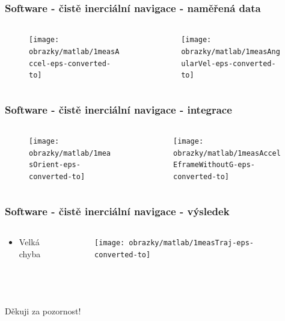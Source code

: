 \documentclass[%
  12pt,       				%
	t,                  %
	aspectratio=1610,   %
	unicode,						%
]{beamer}				    	%
\begin{document}
\begin{frame} 
	\frametitle{Software - čistě inerciální navigace - naměřená data}
	\begin{columns}[T] 								%
		\begin{column}{0.5\textwidth}		%
		\begin{figure}%
		\centering
		\texttt{[image: obrazky/matlab/1measAccel-eps-converted-to]}
		\end{figure}

		\end{column}
		\begin{column}{0.5\textwidth}		%
		\begin{figure}%
		\centering
		\texttt{[image: obrazky/matlab/1measAngularVel-eps-converted-to]}
		\end{figure}
		\end{column}
	\end{columns}	
\end{frame}

\begin{frame} 
	\frametitle{Software - čistě inerciální navigace - integrace}
	\begin{columns}[T] 								%
		\begin{column}{0.5\textwidth}		%
		\begin{figure}%
		\centering
		\texttt{[image: obrazky/matlab/1measOrient-eps-converted-to]}
		\end{figure}

		\end{column}
		\begin{column}{0.5\textwidth}		%
		\begin{figure}%
		\centering
		\texttt{[image: obrazky/matlab/1measAccelEframeWithoutG-eps-converted-to]}
		\end{figure}
		\end{column}
	\end{columns}	
\end{frame}

\begin{frame} 
	\frametitle{Software - čistě inerciální navigace - výsledek}
	\begin{columns}[T] 								%
		\begin{column}{0.5\textwidth}		%
		\begin{itemize}
				\item Velká chyba
				
				
			\end{itemize}

		\end{column}
		\begin{column}{0.5\textwidth}		%
		\begin{figure}%
		\centering
		\texttt{[image: obrazky/matlab/1measTraj-eps-converted-to]}
		\end{figure}
		\end{column}
	\end{columns}	
\end{frame}


\begin{frame}[c] 
	\frametitle{\mbox{ }}
	\begin{center}
		{\Huge Děkuji za pozornost!}
	\end{center}
\end{frame}
\end{document}
